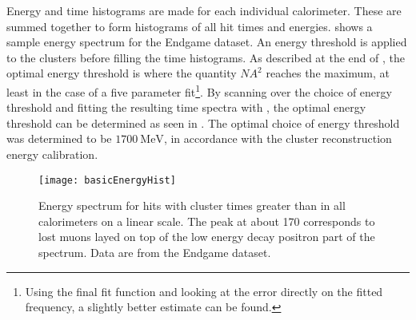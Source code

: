 Energy and time histograms are made for each individual calorimeter. These are summed together to form histograms of all hit times and energies.  shows a sample energy spectrum for the Endgame dataset. An energy threshold is applied to the clusters before filling the time histograms. As described at the end of , the optimal energy threshold is where the quantity $NA^{2}$ reaches the maximum, at least in the case of a five parameter fit\footnote{Using the final fit function and looking at the error directly on the fitted \wa frequency, a slightly better estimate can be found.}. By scanning over the choice of energy threshold and fitting the resulting time spectra with , the optimal energy threshold can be determined as seen in . The optimal choice of energy threshold was determined to be $\SI{1700}{\MeV}$, in accordance with the cluster reconstruction energy calibration. 

\begin{figure}
    \centering
    \texttt{[image: basicEnergyHist]}
    \caption[Sample energy spectrum]{Energy spectrum for hits with cluster times greater than  in all calorimeters on a linear scale. The peak at about 170 \MeV corresponds to lost muons layed on top of the low energy decay positron part of the spectrum. Data are from the Endgame dataset.}
    \label{fig:energyHist}
\end{figure}


